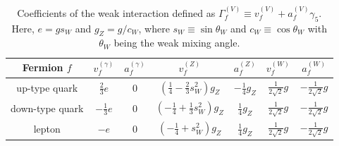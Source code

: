 \documentclass[12pt,twoside,book]{article}
\begin{document}
\begin{table}[t]
  \centering
  \def\arraystretch{1.2}
  \begin{tabular}{c|cccccc}
    Fermion $f$ & $v_f^{(\gamma)}$ & $a_f^{(\gamma)}$ & $v_f^{(Z)}$ & $a_f^{(Z)}$ & $v_f^{(W)}$ & $a_f^{(W)}$ \\ \hline
    up-type quark & $\frac{2}{3}e$ & 0 & $(\frac{1}{4}-\frac{2}{3}s_W^2) g_Z$ & $-\frac{1}{4}g_Z$ & $\frac{1}{2\sqrt{2}}g$ & $-\frac{1}{2\sqrt{2}}g$ \\
    down-type quark & $-\frac{1}{3}e$ & 0 & $(-\frac{1}{4}+\frac{1}{3}s_W^2)g_Z$ & $\frac{1}{4}g_Z$ & $\frac{1}{2\sqrt{2}}g$ & $-\frac{1}{2\sqrt{2}}g$ \\
    lepton & $-e$ & 0 & $(-\frac{1}{4}+s_W^2)g_Z$ & $\frac{1}{4}g_Z$ & $\frac{1}{2\sqrt{2}}g$ & $-\frac{1}{2\sqrt{2}}g$ \\
  \end{tabular}
  \caption{Coefficients of the weak interaction defined as
    $\Gamma_f^{(V)} \equiv v_f^{(V)} + a_f^{(V)} \gamma_5$.  Here, $e = g
    s_W$ and $g_Z = g / c_W$, where $s_W \equiv \sin \theta_W$ and $c_W
    \equiv \cos \theta_W$ with $\theta_W$ being the weak mixing angle.}
  \label{table_weak}
\end{table}
\end{document}
